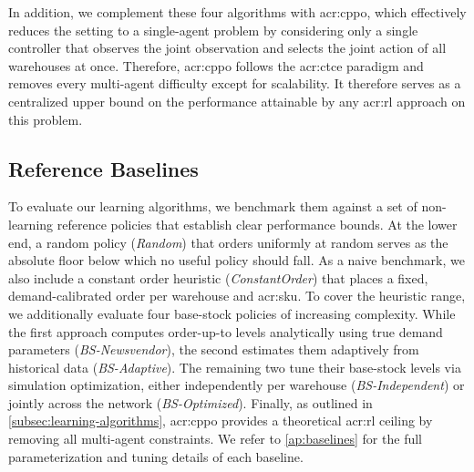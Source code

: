 In addition, we complement these four algorithms with \gls{acr:cppo}, which effectively reduces the setting to a single-agent problem by considering only a single controller that observes the joint observation and selects the joint action of all warehouses at once. Therefore, \gls{acr:cppo} follows the \gls{acr:ctce} paradigm and removes every multi-agent difficulty except for scalability. It therefore serves as a centralized upper bound on the performance attainable by any \gls{acr:rl} approach on this problem.\\

\subsection{Reference Baselines}
\label{subsec:reference-baselines}
To evaluate our learning algorithms, we benchmark them against a set of non-learning reference policies that establish clear performance bounds. At the lower end, a random policy (\textit{Random}) that orders uniformly at random serves as the absolute floor below which no useful policy should fall. As a naive benchmark, we also include a constant order heuristic (\textit{ConstantOrder}) that places a fixed, demand-calibrated order per warehouse and \gls{acr:sku}. To cover the heuristic range, we additionally evaluate four base-stock policies of increasing complexity. While the first approach computes order-up-to levels analytically using true demand parameters (\textit{BS-Newsvendor}), the second estimates them adaptively from historical data (\textit{BS-Adaptive}). The remaining two tune their base-stock levels via simulation optimization, either independently per warehouse (\textit{BS-Independent}) or jointly across the network (\textit{BS-Optimized}). Finally, as outlined in \autoref{subsec:learning-algorithms}, \gls{acr:cppo} provides a theoretical \gls{acr:rl} ceiling by removing all multi-agent constraints. We refer to \autoref{ap:baselines} for the full parameterization and tuning details of each baseline.\\


